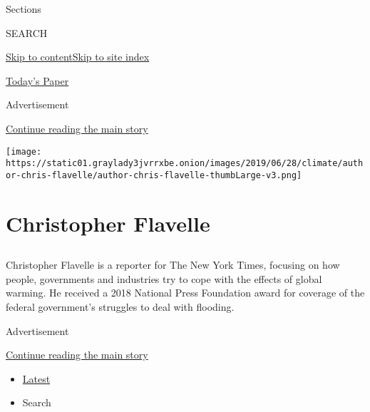 Sections

SEARCH

\protect\hyperlink{site-content}{Skip to
content}\protect\hyperlink{site-index}{Skip to site index}

\href{https://myaccount.nytimes3xbfgragh.onion/auth/login?response_type=cookie\&client_id=vi}{}

\href{https://www.nytimes3xbfgragh.onion/section/todayspaper}{Today's
Paper}

Advertisement

\protect\hyperlink{after-top}{Continue reading the main story}

\texttt{[image: https://static01.graylady3jvrrxbe.onion/images/2019/06/28/climate/author-chris-flavelle/author-chris-flavelle-thumbLarge-v3.png]}

\hypertarget{christopher-flavelle}{%
\section{Christopher Flavelle}\label{christopher-flavelle}}

\subsection{}

Christopher Flavelle is a reporter for The New York Times, focusing on
how people, governments and industries try to cope with the effects of
global warming. He received a 2018 National Press Foundation award for
coverage of the federal government's struggles to deal with flooding.

Advertisement

\protect\hyperlink{after-mid1}{Continue reading the main story}

\begin{itemize}
\tightlist
\item
  \protect\hyperlink{stream-panel}{Latest}
\item
  Search
\end{itemize}

